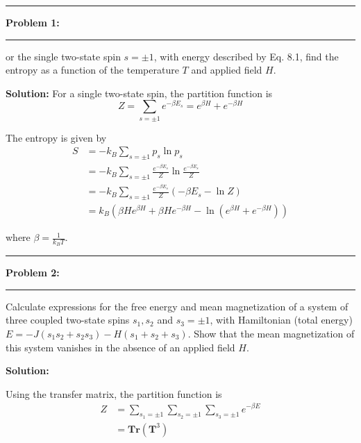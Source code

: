 \documentclass[11pt]{article}
\newcommand\question[2]{\vspace{.25in}\hrule\textbf{#1: #2}\vspace{.5em}\hrule\vspace{.10in}}
\begin{document}
\raggedright
\newcommand\NAME{Shi You}  %
\newcommand\ANDREWID{0xfffff}     %
\newcommand\HWNUM{2}              %

\newcommand{\sumn}{\sum_{n=0}^{\infty}}
\newcommand{\ea}{e^{\alpha}}
\newcommand{\nea}{e^{-\alpha}}
\newcommand{\expo}{\left(-\beta n\epsilon\right)}
\newcommand{\dif}{\mathrm{d}}
\newcommand{\solution}{\textbf{Solution:}}
\newcommand{\T}{\mathbf{T}}
\newcommand{\U}{\mathbf{U}}
\newcommand{\p}{\partial}

\question{Problem 1}{}
or the single two-state spin $s = \pm 1$, with energy described by Eq. 8.1, find the entropy as a function of the temperature $T$ and applied field $H$.

\solution
For a single two-state spin, the partition function is
\begin{equation}
    Z = \sum_{s = \pm 1} e^{-\beta E_s} = e^{\beta H} + e^{-\beta H}
\end{equation}

The entropy is given by
\begin{align*}
    S &= -k_B \sum_{s = \pm 1} p_s \ln p_s \\
      &= -k_B \sum_{s = \pm 1} \frac{e^{-\beta E_s}}{Z} \ln \frac{e^{-\beta E_s}}{Z} \\
      &= -k_B \sum_{s = \pm 1} \frac{e^{-\beta E_s}}{Z} \left(-\beta E_s - \ln Z\right) \\
      &= k_B \left(\beta H e^{\beta H} + \beta H e^{-\beta H} - \ln \left(e^{\beta H} + e^{-\beta H}\right)\right)
\end{align*}

where $\beta = \frac{1}{k_B T}$.

\question{Problem 2}{}
Calculate expressions for the free energy and mean magnetization of a system of three coupled two-state spins $s_1, s_2$ and $s_3 = \pm 1$, with Hamiltonian (total energy) $E = -J(s_1s_2 + s_2s_3) -H (s_1 + s_2 + s_3)$. Show that the mean magnetization of this system vanishes in the absence of an applied field $H$.

\solution

Using the transfer matrix, the partition function is
\begin{align*}
    Z &= \sum_{s_1 = \pm 1} \sum_{s_2 = \pm 1} \sum_{s_3 = \pm 1} e^{-\beta E} \\
      &= \mathbf{Tr}(\mathbf{T}^3)
\end{align*}
\end{document}
